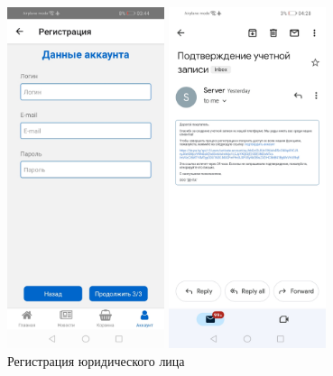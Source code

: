 \begin{figure}[!p]
\begin{minipage}{0.24\textwidth}
        \includegraphics[height=10cm]
        {images/android/account-registration-step3.jpg}
    \end{minipage}
    \begin{minipage}{0.24\textwidth}
        \centering

        \includegraphics[height=10cm]
        {images/android/account-registration-step4.jpg}
    \end{minipage}

    \caption{Регистрация юридического лица}
    \label{fig:android_registration}
\end{figure}
